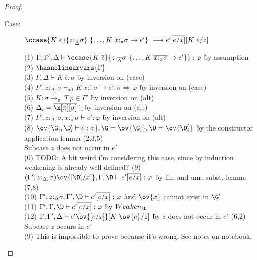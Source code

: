 \begin{proof}
\begin{description}
\item[Case:]
    $\ccase{K~\overline{e}}{z{:}_{\overline{\Delta}}\sigma}~\{\dots,K~\overline{x{:}_\pi\sigma}\to e'\}\ \longrightarrow e'\overline{[e/x]}[K~\overline{e}/z]$
\begin{tabbing}
(1) $\Gamma,\Gamma',\Delta \vdash \ccase{K~\overline{e}}{z{:}_{\overline{\Delta}}\sigma~\{\dots,K~\overline{x{:}_\pi\sigma}\to e'\}} : \varphi$ \` by assumption \\
(2) $\hasnolinearvars{\Gamma}$\\
(3) $\Gamma, \Delta \vdash K~\overline{e} : \sigma$ \` by inversion on (case) \\
(4) $\Gamma', z{:}_{\Delta_i}\sigma \vdash_{alt} K~\overline{x{:}_\pi\sigma} \to e' : \sigma \Longrightarrow \varphi$ \` by inversion on (case) \\
(5) $K : \overline{\sigma \to_\pi}~T~\overline{p} \in \Gamma'$ \` by inversion on (alt) \\
(6) $\Delta_i = \overline{\x[\pi][\sigma]}\!\upharpoonright_1$\` by inversion on (alt)\\
(7) $\Gamma',z{:}_{\Delta_i}\sigma,\overline{x{:}_\pi\sigma} \vdash e' : \varphi$ \` by inversion on (alt) \\
(8) $\ov{\G_i, \D'_i \vdash e : \sigma}, \G = \ov{\G_i}, \D = \ov{\D'_i}$ \` by the constructor application lemma (2,3,5) \\
Subcase $z$ does not occur in $e'$\\
(0) TODO: A bit weird i'm considering this case, since by induction weakening is already well defined?
(9) $(\Gamma', z{:}_{\Delta_i}\sigma)\ov{[\D'_i/x]}, \Gamma, \D \vdash e'\overline{[e/x]} : \varphi$ \` by lin. and unr. subst. lemma (7,8) \\
(10) $\Gamma', z{:}_{\Delta}\sigma, \Gamma', \D \vdash e'\overline{[e/x]} : \varphi$ \` and $\ov{x}$ cannot exist in $\G'$ \\
(11) $\Gamma', \Gamma, \D \vdash e'\overline{[e/x]} : \varphi$ \` by $Weaken_\D$\\
(12) $\Gamma, \Gamma', \Delta \vdash e'\ov{[e/x]}[K~\ov{e}/z]$ \` by $z$ does not occur in $e'$ (6,2) \\
Subcase $z$ occurs in $e'$\\
(9) This is impossible to prove because it's wrong. See notes on notebook.
\end{tabbing}


\end{description}
\end{proof}
